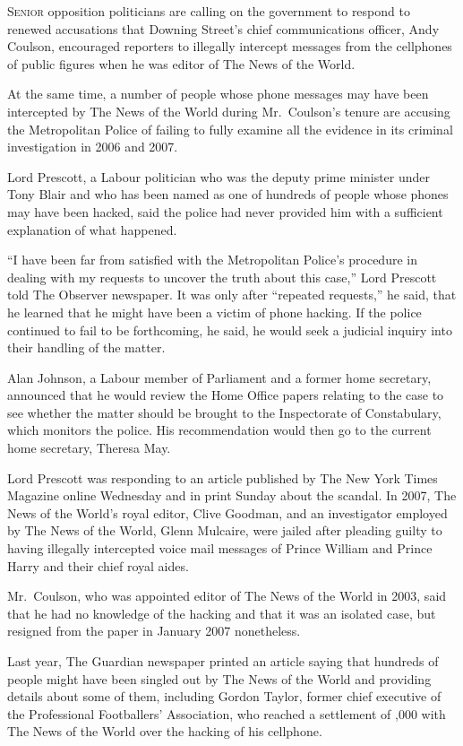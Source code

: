 ﻿\documentclass[12pt]{article}
\begin{document}
\lettrine{S}{enior} opposition politicians are calling on the government to
respond to renewed accusations that Downing Street's chief communications officer, Andy Coulson,
encouraged reporters to illegally intercept messages from the cellphones of public figures when he
was editor of The News of the World.

At the same time, a number of people whose phone messages may have been intercepted by The News of
the World during Mr.~Coulson's tenure are accusing the Metropolitan Police of failing to fully
examine all the evidence in its criminal investigation in 2006 and 2007.

Lord Prescott, a Labour politician who was the deputy prime minister under Tony Blair and who has
been named as one of hundreds of people whose phones may have been hacked, said the police had never
provided him with a sufficient explanation of what happened.

``I have been far from satisfied with the Metropolitan Police's procedure in dealing with my
requests to uncover the truth about this case,'' Lord Prescott told The Observer newspaper. It was
only after ``repeated requests,'' he said, that he learned that he might have been a victim of phone
hacking. If the police continued to fail to be forthcoming, he said, he would seek a judicial
inquiry into their handling of the matter.

Alan Johnson, a Labour member of Parliament and a former home secretary, announced that he would
review the Home Office papers relating to the case to see whether the matter should be brought to
the Inspectorate of Constabulary, which monitors the police. His recommendation would then go to the
current home secretary, Theresa May.

Lord Prescott was responding to an article published by The New York Times Magazine online Wednesday
and in print Sunday about the scandal. In 2007, The News of the World's royal editor, Clive Goodman,
and an investigator employed by The News of the World, Glenn Mulcaire, were jailed after pleading
guilty to having illegally intercepted voice mail messages of Prince William and Prince Harry and
their chief royal aides.

Mr.~Coulson, who was appointed editor of The News of the World in 2003, said that he had no
knowledge of the hacking and that it was an isolated case, but resigned from the paper in January
2007 nonetheless.

Last year, The Guardian newspaper printed an article saying that hundreds of people might have been
singled out by The News of the World and providing details about some of them, including Gordon
Taylor, former chief executive of the Professional Footballers' Association, who reached a
settlement of ,000 with The News of the World over the hacking of his cellphone.
\end{document}
